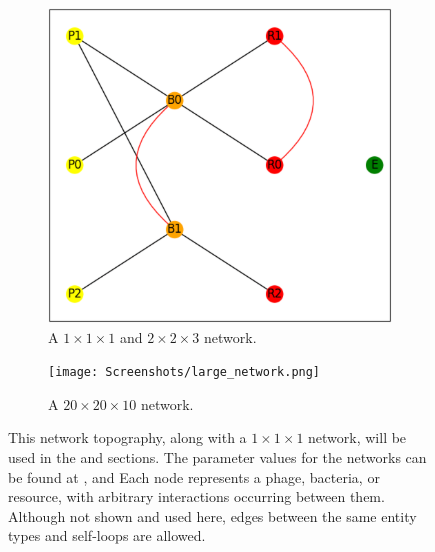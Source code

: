 \begin{figure}
\begin{subfigure}{0.49\linewidth}
        \includegraphics[width=\linewidth]{Screenshots/example_network.png}
        \caption{
            A $1\times1\times1$ and $2\times 2 \times 3$ network. 
        }
        \label{fig:ss:example_network}
    \end{subfigure} 
    \begin{subfigure}{0.49\linewidth}
        \centering
        \captionsetup{width=1\linewidth}
        \texttt{[image: Screenshots/large\_network.png]}
        \caption{
            A $20\times20\times10$ network. 
        }
        \label{fig:ss:example_large_network}
    \end{subfigure} 
    \caption{
        This network topography, along with a $1 \times 1 \times 1$ network, will be used in the  and  sections. 
        The parameter values for the networks can be found at ,  and 
        Each node represents a phage, bacteria, or resource, with arbitrary interactions occurring between them. 
        Although not shown and used here, edges between the same entity types and self-loops are allowed. 
    }
    \label{fig:ss:GUI_tool_and_network}
 \end{figure}


